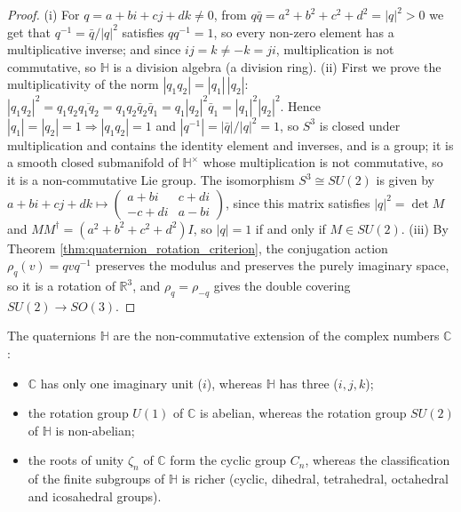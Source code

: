 \begin{proof}
(i) For $q = a + bi + cj + dk \neq 0$, from $q\bar{q} = a^2+b^2+c^2+d^2 = |q|^2 > 0$ we get that $q^{-1} = \bar{q}/|q|^2$ satisfies $q q^{-1} = 1$, so every non-zero element has a multiplicative inverse; and since $ij = k \neq -k = ji$, multiplication is not commutative, so $\mathbb{H}$ is a division algebra (a division ring).
(ii) First we prove the multiplicativity of the norm $|q_1 q_2| = |q_1|\,|q_2|$: $|q_1 q_2|^2 = q_1 q_2 \overline{q_1 q_2} = q_1 q_2 \bar{q}_2 \bar{q}_1 = q_1 |q_2|^2 \bar{q}_1 = |q_1|^2 |q_2|^2$. Hence $|q_1|=|q_2|=1 \Rightarrow |q_1 q_2|=1$ and $|q^{-1}| = |\bar{q}|/|q|^2 = 1$, so $S^3$ is closed under multiplication and contains the identity element and inverses, and is a group; it is a smooth closed submanifold of $\mathbb{H}^\times$ whose multiplication is not commutative, so it is a non-commutative Lie group. The isomorphism $S^3 \cong SU(2)$ is given by $a+bi+cj+dk \mapsto \begin{pmatrix} a+bi & c+di \\ -c+di & a-bi \end{pmatrix}$, since this matrix satisfies $|q|^2 = \det M$ and $M M^\dagger = (a^2+b^2+c^2+d^2)I$, so $|q|=1$ if and only if $M \in SU(2)$.
(iii) By Theorem \ref{thm:quaternion_rotation_criterion}, the conjugation action $\rho_q(v) = q v q^{-1}$ preserves the modulus and preserves the purely imaginary space, so it is a rotation of $\mathbb{R}^3$, and $\rho_q = \rho_{-q}$ gives the double covering $SU(2) \to SO(3)$.
\end{proof}

\begin{remark}\label{rem:quaternion_vs_complex}
The quaternions $\mathbb{H}$ are the non-commutative extension of the complex numbers $\mathbb{C}$:
\begin{itemize}
    \item $\mathbb{C}$ has only one imaginary unit ($i$), whereas $\mathbb{H}$ has three ($i,j,k$);
    \item the rotation group $U(1)$ of $\mathbb{C}$ is abelian, whereas the rotation group $SU(2)$ of $\mathbb{H}$ is non-abelian;
    \item the roots of unity $\zeta_n$ of $\mathbb{C}$ form the cyclic group $C_n$, whereas the classification of the finite subgroups of $\mathbb{H}$ is richer (cyclic, dihedral, tetrahedral, octahedral and icosahedral groups).
\end{itemize}
\end{remark}

